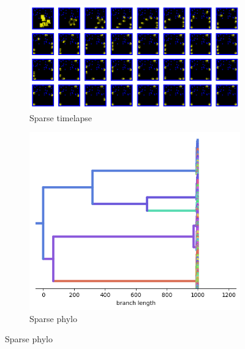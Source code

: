 \begin{figure}[htbp]
  \centering
  \begin{subfigure}[b]{0.65\textwidth}
    \centering
    \includegraphics[width=\textwidth]{img/dev-timelapse-sparse.png}
    \caption{Sparse timelapse}
    \label{fig:dev-sample:dev-timelapse-sparse}
  \end{subfigure}%
  \hfill
  \begin{subfigure}[b]{0.35\textwidth}
    \centering
    \includegraphics[width=\textwidth]{img/dev-phylo-sparse.png}
    \caption{Sparse phylo}
    \label{fig:dev-sample:dev-phylo-sparse}
  \end{subfigure}

  \vspace{1em}


\end{figure}
